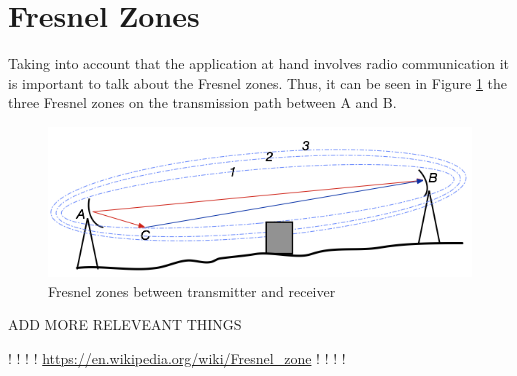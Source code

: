 \section{Fresnel Zones}
Taking into account that the application at hand involves radio communication it is important to talk about the Fresnel zones. Thus, it can be seen in Figure \ref{fig:fresnel_zones} the three Fresnel zones on the transmission path between A and B. 

\begin{figure}[h]
	\centering
	\includegraphics[scale=0.65]{figures/fresnel_zones.png}
	\caption{Fresnel zones between transmitter and receiver}
	\label{fig:fresnel_zones}
\end{figure}


ADD MORE RELEVEANT THINGS 

! ! ! ! \url{https://en.wikipedia.org/wiki/Fresnel_zone}  ! ! ! !